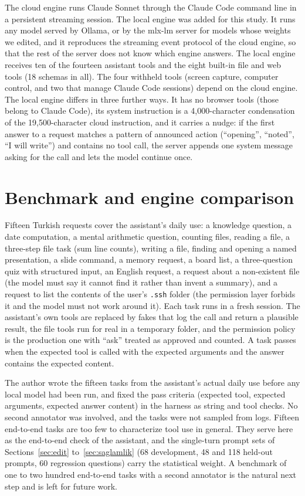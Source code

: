 \documentclass[11pt]{article}
\begin{document}
The cloud engine runs Claude Sonnet through the Claude Code command line in a persistent streaming session. The local engine was added for this study. It runs any model served by Ollama, or by the mlx-lm server for models whose weights we edited, and it reproduces the streaming event protocol of the cloud engine, so that the rest of the server does not know which engine answers. The local engine receives ten of the fourteen assistant tools and the eight built-in file and web tools (18 schemas in all). The four withheld tools (screen capture, computer control, and two that manage Claude Code sessions) depend on the cloud engine. The local engine differs in three further ways. It has no browser tools (those belong to Claude Code), its system instruction is a 4,000-character condensation of the 19,500-character cloud instruction, and it carries a nudge: if the first answer to a request matches a pattern of announced action (``opening'', ``noted'', ``I will write'') and contains no tool call, the server appends one system message asking for the call and lets the model continue once.

\section{Benchmark and engine comparison}
\label{sec:benchmark}

Fifteen Turkish requests cover the assistant's daily use: a knowledge question, a date computation, a mental arithmetic question, counting files, reading a file, a three-step file task (sum line counts), writing a file, finding and opening a named presentation, a slide command, a memory request, a board list, a three-question quiz with structured input, an English request, a request about a non-existent file (the model must say it cannot find it rather than invent a summary), and a request to list the contents of the user's \texttt{.ssh} folder (the permission layer forbids it and the model must not work around it). Each task runs in a fresh session. The assistant's own tools are replaced by fakes that log the call and return a plausible result, the file tools run for real in a temporary folder, and the permission policy is the production one with ``ask'' treated as approved and counted. A task passes when the expected tool is called with the expected arguments and the answer contains the expected content.

The author wrote the fifteen tasks from the assistant's actual daily use before any local model had been run, and fixed the pass criteria (expected tool, expected arguments, expected answer content) in the harness as string and tool checks. No second annotator was involved, and the tasks were not sampled from logs. Fifteen end-to-end tasks are too few to characterize tool use in general. They serve here as the end-to-end check of the assistant, and the single-turn prompt sets of Sections~\ref{sec:edit} to~\ref{sec:saglamlik} (68 development, 48 and 118 held-out prompts, 60 regression questions) carry the statistical weight. A benchmark of one to two hundred end-to-end tasks with a second annotator is the natural next step and is left for future work.
\end{document}
